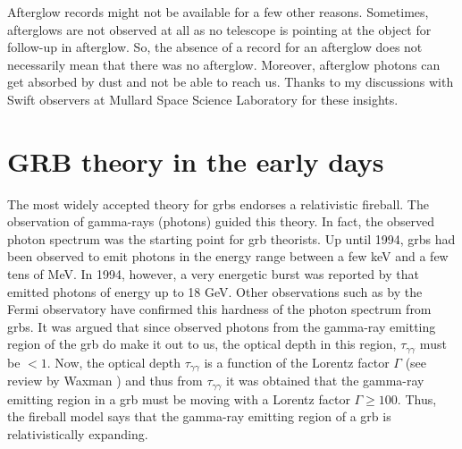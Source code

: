 Afterglow records might not be available for a few other reasons. 
Sometimes, afterglows are not observed at all as no telescope is pointing at the object for follow-up in afterglow. So, the absence of a record for an afterglow does not necessarily mean that there was no afterglow. Moreover, afterglow photons can get absorbed by dust and not be able to reach us. Thanks to my discussions with Swift observers at Mullard Space Science Laboratory for these insights.



\section{GRB theory in the early days}
\label{early_theory}

The most widely accepted theory for \gls{grbs} endorses a relativistic fireball. 
The observation of gamma-rays (photons) guided this theory. In fact, the observed photon spectrum was the starting point for \gls{grb} theorists. Up until 1994, \gls{grbs} had been observed to emit photons in the energy range between a few keV and a few tens of MeV. In 1994, however, a very energetic burst was reported by \cite{longhardgrb} that emitted photons of energy up to 18 GeV. Other observations such as by the Fermi observatory \cite{fermishorthardgrb} have confirmed this hardness of the photon spectrum from \gls{grbs}. It was argued that since observed photons from the gamma-ray emitting region of the \gls{grb} do make it out to us, the optical depth in this region, $\tau_{\gamma \gamma}$ must be $< 1$. Now, the optical depth $\tau_{\gamma \gamma}$ is a function of the Lorentz factor $\Gamma$ (see review by Waxman \cite{Waxmanreview}) and thus from $\tau_{\gamma \gamma}$ it was obtained that the gamma-ray emitting region in a \gls{grb} must be moving with a Lorentz factor $\Gamma \geq 100$. Thus, the fireball model says that the gamma-ray emitting region of a \gls{grb} is relativistically expanding.

